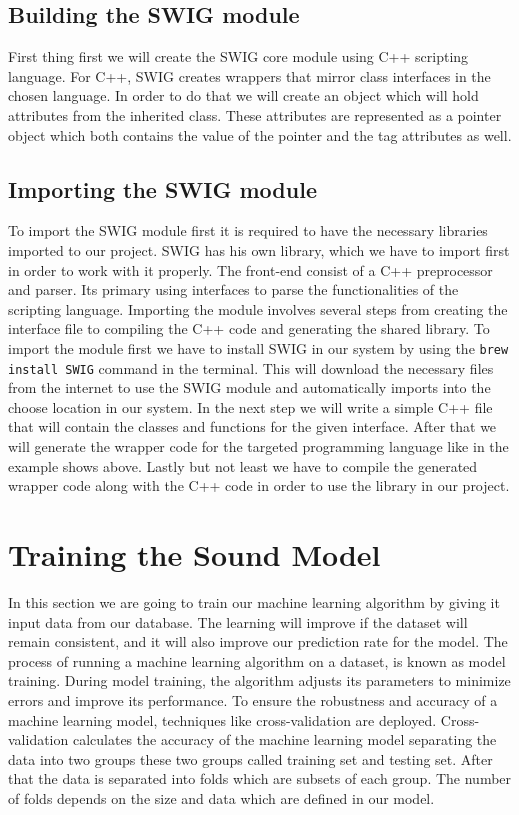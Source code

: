 \documentclass[english,12pt,oneside,a4paper]{article}
\begin{document}
		\subsection{Building the SWIG module}
		First thing first we will create the SWIG core module using C++ scripting language. For C++, SWIG creates wrappers that mirror class interfaces in the chosen language. In order to do that we will create an object which will hold attributes from the inherited class. These attributes are represented as a pointer object which both contains the value of the pointer and the tag attributes as well. 
		\subsection{Importing the SWIG module}
		To import the SWIG module first it is required to have the necessary libraries imported to our project.
		 SWIG has his own library, which we have to import first in order to work with it properly. The front-end consist of a C++ preprocessor and parser. Its primary using interfaces to parse the functionalities of the scripting language.
		 Importing the module involves several steps  from creating the interface file to compiling the C++ code and generating the shared library. To import the module first we have to install SWIG in our system by using the 
		 \texttt{brew install SWIG} command in the terminal. This will download the necessary files from the internet to use the SWIG module and automatically imports into the choose location in our system. In the next step we will write a simple C++ file that will contain the classes and functions for the given interface. After that we will generate the wrapper code for the targeted programming language like in the example shows above. Lastly but not least we have to compile the generated wrapper code along with the C++ code in order to use the library in our project. 
		 \section{Training the Sound Model}
		In this section we are going to train our machine learning algorithm by giving it input data from our database. The learning will improve if the dataset will remain consistent, and it will also improve our prediction rate for the model. The process of running a machine learning algorithm on a dataset, is known as model training. During model training, the algorithm adjusts its parameters to minimize errors and improve its performance. To ensure the robustness and accuracy of a machine learning model, techniques like cross-validation are deployed. Cross-validation calculates the accuracy of the machine learning model separating the data into two groups these two groups called  training set and testing set. After that the data is separated into folds which are subsets of each group. The number of folds depends on the size and data which are defined in our model.
\end{document}
